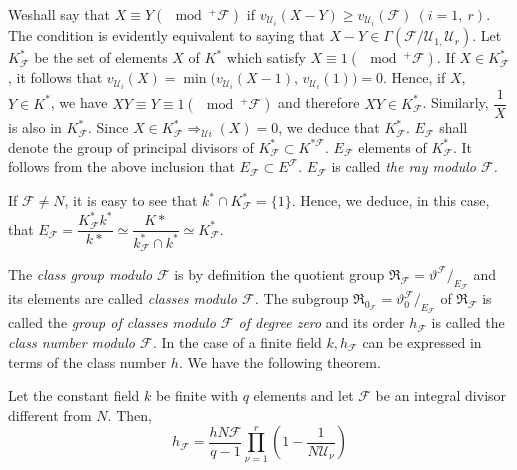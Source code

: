  We\pageoriginale shall say that  $ X \equiv Y ( \mod^+ \mathcal{F} ) $ if $
 v_{\mathscr{U}_{i}} (X -Y ) \ge v_{\mathscr{U}_{i}} (\mathcal{F})~ (
 i= 1,~ r) $. The condition is evidently equivalent to saying that $ X
 - Y \in \Gamma ( \mathcal{F}/\mathscr{U}_{1,} \mathscr{U}_{r} )
 $. Let $ K^*_\mathcal{F} $ be the set of elements $X$ of $K^*$ which
 satisfy $ X \equiv 1 ( \mod^+ \mathcal{F} ) $. If $ X \in
 K^*_\mathcal{F} $, it follows that $ v_{\mathscr{U}_{i}} (X) = \min (
 v_{\mathscr{U}_{i}} (X-1) $, $ v_{\mathscr{U}_{i}} ( 1 )) = 0
 $. Hence, if $ X $, $ Y \in K^* $, we have $ XY \equiv Y \equiv 1 (
 \mod^+ \mathcal{F} ) $ and  therefore   $ XY \in K^*_\mathcal{F}
 $. Similarly, $ \dfrac{1}{X} $ is also in $ K^*_\mathcal{F} $. Since $
 X \in K^*_\mathcal{F} \Rightarrow_{\mathscr{U} i} (X) = 0 $, we
 deduce that $ K^*_\mathcal{F} $. $ E_\mathcal{F} $ shall denote the
 group of principal divisors of $K^*_{\mathcal{F}} \subset
 K^{*\mathcal{F}}$. $E_{\mathcal{F}}$ elements of $ K^*_\mathcal{F} $. It
 follows from the above inclusion that  $ E_\mathcal{F} \subset
 E^\mathcal{F} $. $ E_\mathcal{F} $ is  called \textit{ the ray modulo
   $ \mathcal{F} $.} 

If $ \mathcal{F} \neq N $, it is easy to see that  $ k^* \cap
K^*_\mathcal{F} = \big\{ 1 \big \} $. Hence, we deduce, in this case,
that $ E_\mathcal{F} = \dfrac{K^*_{\mathcal{F}} k^*}{k*} \simeq
\dfrac{K*}{k^*_\mathcal{F} \cap k^*} \simeq K^*_\mathcal{F} $. 

The \textit{class group modulo} $ \mathcal{F} $ is by definition the
quotient group $ \mathfrak{R}_{\mathcal{F}} = \vartheta^{\mathcal{F}}
  /_{E_{\mathcal{F}}} $  and its elements are called  \textit{
  classes modulo $\mathcal{F}$.} The subgroup $
\mathfrak{R}_{0_{\mathcal{F}}} =
\vartheta^\mathcal{F}_{0}/_{E_{\mathcal{F}}} $ of $
\mathfrak{R}_\mathcal{F} $ is called the \textit{group of classes
  modulo $\mathcal{F}$ of degree zero} and its order $h_\mathcal{F}$
is called the \textit{ class number modulo $ \mathcal{F} $.} In the
case of a finite field $ k,h_\mathcal{F} $ can be expressed  in terms
of the class number $h$. We have the following  theorem. 

\begin{theorem*}
  Let the constant field $k$ be finite with $q$ elements and let $
  \mathcal{F} $ be an integral divisor different from $N$. Then, 
  $$
  h_\mathcal{F} = \frac{h N \mathcal{F}}{q-1} \prod^{r}_{\nu = 1} \left( 1
  - \frac{1}{N\mathscr{U}_\nu}\right)  
  $$
\end{theorem*} 
 
